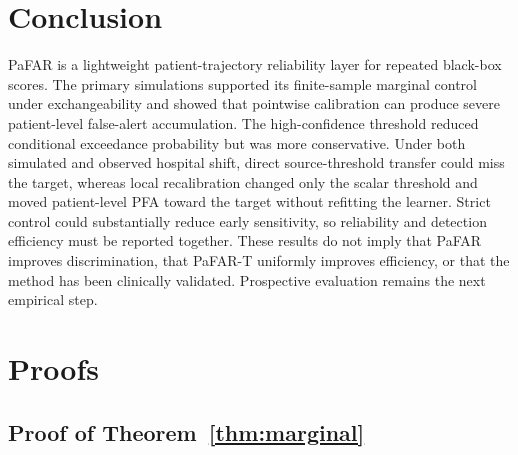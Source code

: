 \documentclass[11pt]{article}
\begin{document}
\section{Conclusion}

PaFAR is a lightweight patient-trajectory reliability layer for repeated black-box scores. The primary simulations supported its finite-sample marginal control under exchangeability and showed that pointwise calibration can produce severe patient-level false-alert accumulation. The high-confidence threshold reduced conditional exceedance probability but was more conservative. Under both simulated and observed hospital shift, direct source-threshold transfer could miss the target, whereas local recalibration changed only the scalar threshold and moved patient-level PFA toward the target without refitting the learner. Strict control could substantially reduce early sensitivity, so reliability and detection efficiency must be reported together. These results do not imply that PaFAR improves discrimination, that PaFAR-T uniformly improves efficiency, or that the method has been clinically validated. Prospective evaluation remains the next empirical step.
\appendix

\section{Proofs}\label{app:proofs}

\subsection{Proof of Theorem~\ref{thm:marginal}}
\end{document}
